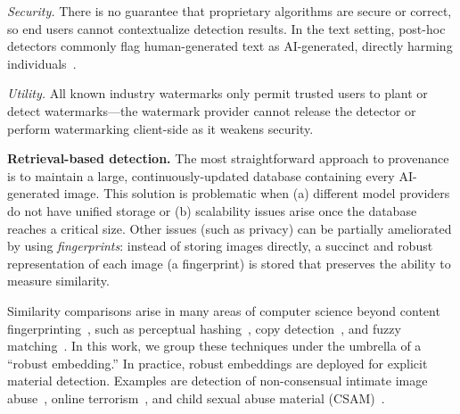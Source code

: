  
\textit{Security.} 
There is no guarantee that proprietary algorithms are secure or correct, so end users cannot contextualize detection results.
In the text setting, post-hoc detectors commonly flag human-generated text as AI-generated, directly harming individuals~\citep{gegg2024ai}.

\textit{Utility.} All known industry watermarks only permit trusted users to plant or detect watermarks---the watermark provider cannot release the detector or perform watermarking client-side as it weakens security.

\textbf{Retrieval-based detection.} 
The most straightforward approach to provenance is to maintain a large, continuously-updated database containing every AI-generated image.
This solution is problematic when (a) different model providers do not have unified storage or (b) scalability issues arise once the database reaches a critical size.
Other issues (such as privacy) can be partially ameliorated by using \textit{fingerprints}: instead of storing images directly, a succinct and robust representation of each image (a fingerprint) is stored that preserves the ability to measure similarity.

Similarity comparisons arise in many areas of computer science beyond content fingerprinting~\citep{seo2004robust}, such as perceptual hashing~\citep{indyk1998approximate}, copy detection~\citep{chen2020simple}, and fuzzy matching~\citep{chaudhuri2003robust}.
In this work, we group these techniques under the umbrella of a ``robust embedding.''
In practice, robust embeddings are deployed for explicit material detection.
Examples are detection of non-consensual intimate image abuse~\citep{stopncii}, online terrorism~\citep{saltman2021practical}, and child sexual abuse material (CSAM)~\citep{apple2021csam,prokos2023squint}.